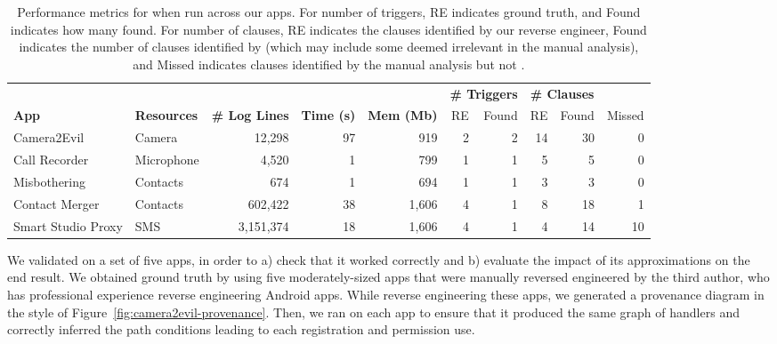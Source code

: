 \begin{table*}
{
  \singlespacing
  \tiny
  \centering
  \begin{tabular}{llr|rr|rrrrr}
    \toprule
     &&&&& \multicolumn{2}{l}{\textbf{\# Triggers}} &  \multicolumn{3}{l}{\textbf{\# Clauses}} \\
       \textbf{App} & \textbf{Resources} & \textbf{\# Log Lines} & \textbf{Time (s)} & \textbf{Mem (Mb)}  & RE & Found & RE & Found & Missed \\
      \midrule
      Camera2Evil          & Camera     & 12,298    & 97    & 919    & 2 & 2 & 14 & 30 & 0 \\
      Call Recorder        & Microphone & 4,520     & ~1    & 799    & 1 & 1 & 5  &  5 & 0 \\
      Misbothering         & Contacts   & 674       & ~1    & 694    & 1 & 1 & 3  &  3 & 0 \\
      Contact Merger       & Contacts   & 602,422   & 38    & 1,606  & 4 & 1 & 8  & 18 & 1 \\
      Smart Studio Proxy   & SMS        & 3,151,374 & 18    & 1,606  & 4 & 1 & 4  & 14 & 10 \\
      \bottomrule
  \end{tabular}
  \caption{Performance metrics for \hogarth{} when run across our apps. For number of 
  triggers, RE indicates ground truth, and Found indicates how many \hogarth{} found. For 
  number of clauses, RE indicates the clauses identified by our reverse engineer, Found 
  indicates the number of clauses identified by \hogarth{} (which may include some deemed 
  irrelevant in the manual analysis), and Missed indicates clauses identified by the manual 
  analysis but not \hogarth{}. } 
  \label{tab:performance}
}
\end{table*}

%
We validated \hogarth{} on a set of five apps, in order to a) check that it 
worked correctly and b) evaluate the impact of its approximations on the 
end result. We obtained ground truth by using five moderately-sized apps 
that were manually reversed engineered by the third author, who has professional 
experience reverse engineering Android apps. While
reverse engineering these apps, we generated a provenance diagram in
the style of Figure~\ref{fig:camera2evil-provenance}. Then, we ran
\hogarth{} on each app to ensure that it produced the same graph of
handlers and correctly inferred the path conditions leading to each
registration and permission use.


